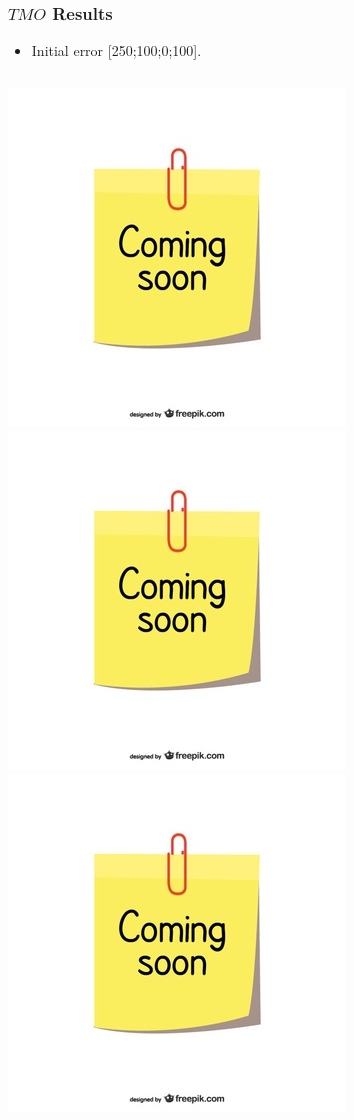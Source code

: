 \documentclass{beamer}
\begin{document}
	\begin{frame}
		\frametitle{$TMO$ Results}
		\begin{itemize}
			\item Initial error [250;100;0;100].
		\end{itemize}
		\begin{columns}[t]
			\centering
			\includegraphics[scale=0.18]{coming-soon}\\
			\includegraphics[scale=0.18]{coming-soon}
			\centering
			\includegraphics[scale=0.18]{coming-soon}\\

\end{columns}
\end{frame}
\end{document}
